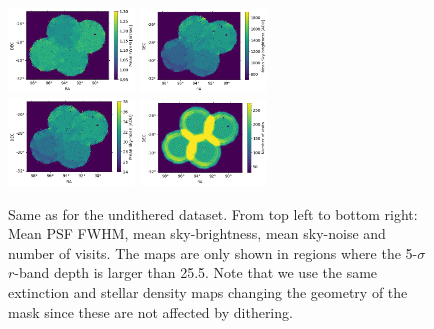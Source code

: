 \documentclass[\docopts]{\docclass}
\begin{document}
\begin{figure}
\centering
\includegraphics[width=0.30\textwidth]{ud_mean_fwhm.png}
\includegraphics[width=0.30\textwidth]{ud_mean_sky.png}\\
\includegraphics[width=0.30\textwidth]{ud_mean_skynoise.png}
\includegraphics[width=0.30\textwidth]{ud_nvisits.png}
\caption{Same as  for the undithered dataset. From top left to bottom right: Mean PSF FWHM, mean sky-brightness, mean sky-noise and number of visits. The maps are only shown in regions where the 5-$\sigma$ $r$-band depth is larger than 25.5. Note that we use the same extinction and stellar density maps changing the geometry of the mask since these are not affected by dithering.}
\label{fig:systematic_maps_ud}
\end{figure}
\end{document}

